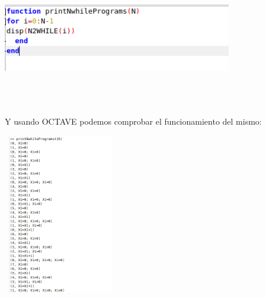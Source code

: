 \documentclass[fleqn, 10pt]{article}
\theoremstyle{plain}
\theoremstyle{definition}
\begin{document}
\begin{center}
\includegraphics[width=10cm, height=6cm]{6.png}
\end{center}

Y usando OCTAVE podemos comprobar el funcionamiento del mismo:
\begin{center}
\includegraphics[width=5cm, height=7cm]{5.png}
\end{center}
\end{document}
